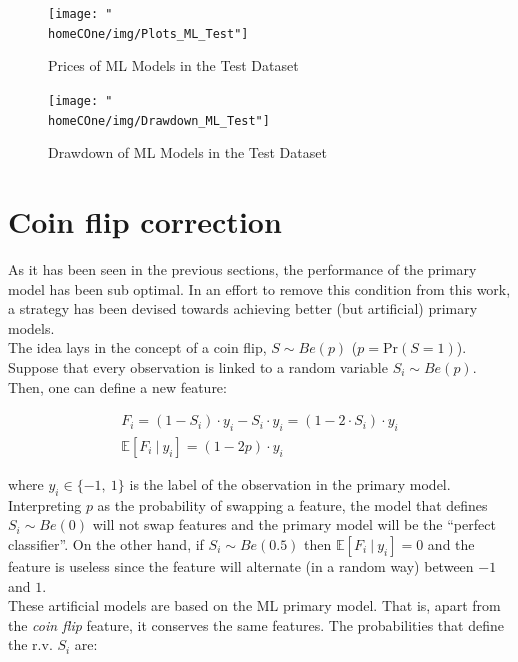 \documentclass[a4paper]{article}
\newcommand{\homeCOne}{../../Chapter 1 - Metalabeling/Draft}
\begin{document}
\begin{figure}[htbp]
	\centering
	\texttt{[image: "\\homeCOne/img/Plots\_ML\_Test"]}
	\caption{Prices of ML Models in the Test Dataset}
	\label{fig:Plots_ML_Test}
\end{figure}

\begin{figure}[htbp]
	\centering
	\texttt{[image: "\\homeCOne/img/Drawdown\_ML\_Test"]}	
	\caption{Drawdown of ML Models in the Test Dataset}	
	\label{fig:Drawdown_ML_Test}
\end{figure}

\vspace{100cm}

\section{Coin flip correction}
\label{coinFlip} 
As it has been seen in the previous sections, the performance of the 
primary model has been sub optimal. In an effort to remove this 
condition from this work, a strategy has been devised towards 
achieving better (but artificial) primary models.\\

The idea lays in the concept of a coin flip, $S \sim Be(p)$ 
($p = \text{Pr}(S = 1)$). Suppose that every observation is linked to 
a random variable $S_i \sim Be(p)$. Then, one can define a new 
feature:

\begin{gather*}
	F_i = (1 - S_i) \cdot y_i - S_i \cdot y_i = 
	(1 - 2 \cdot S_i) \cdot y_i\\
	\mathbb{E}[F_i\ |\ y_i] = (1 - 2p) \cdot y_i
\end{gather*}

where $y_i \in \{-1,\ 1\}$ is the label of the observation in the 
primary model.\\

Interpreting $p$ as the probability of swapping a feature, the model 
that defines $S_i \sim Be(0)$ will not swap features and the primary 
model will be the ``perfect classifier''. On the other hand, if 
$S_i \sim Be(0.5)$ then $\mathbb{E}[F_i\ |\ y_i] = 0$ and the 
feature is useless since the feature will alternate (in a random way) 
between $-1$ and $1$.\\

These artificial models are based on the ML primary model. That is, 
apart from the \textit{coin flip} feature, it conserves the same 
features. The probabilities that define the r.v. $S_i$ are:
\end{document}
